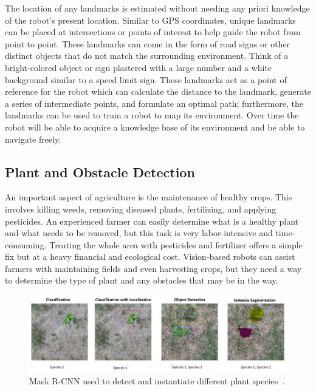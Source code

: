 \documentclass[12pt]{article}
\begin{document}
The location of any landmarks is estimated without needing any priori knowledge of the robot's present location. Similar to GPS coordinates, unique landmarks can be placed at intersections or points of interest to help guide the robot from point to point. These landmarks can come in the form of road signs or other distinct objects that do not match the surrounding environment. Think of a bright-colored object or sign plastered with a large number and a white background similar to a speed limit sign. These landmarks act as a point of reference for the robot which can calculate the distance to the landmark, generate a series of intermediate points, and formulate an optimal path; furthermore, the landmarks can be used to train a robot to map its environment. Over time the robot will be able to acquire a knowledge base of its environment and be able to navigate freely.

\subsection{Plant and Obstacle Detection}
An important aspect of agriculture is the maintenance of healthy crops. This involves killing weeds, removing diseased plants, fertilizing, and applying pesticides. An experienced farmer can easily determine what is a healthy plant and what needs to be removed, but this task is very labor-intensive and time-consuming. Treating the whole area with pesticides and fertilizer offers a simple fix but at a heavy financial and ecological cost. Vision-based robots can assist farmers with maintaining fields and even harvesting crops, but they need a way to determine the type of plant and any obstacles that may be in the way. 

\begin{figure}[h]
\centering
\includegraphics[width=1.0\textwidth]{weedDetection.PNG}
\caption{Mask R-CNN used to detect and instantiate different plant species~\cite{valicharla2021weed}.}
\label{fig:weed}
\end{figure}
\end{document}

